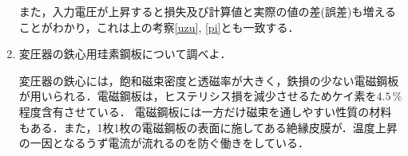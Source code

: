 \begin{enumerate}[1.]
	また，入力電圧が上昇すると損失及び計算値と実際の値の差(誤差)も増えることがわかり，これは上の考察\ref{uzu}, \ref{pi}とも一致する．
	\item 変圧器の鉄心用珪素鋼板について調べよ．\cite{1130282270091060}
	
	変圧器の鉄心には，飽和磁束密度と透磁率が大きく，鉄損の少ない電磁鋼板が用いられる．電磁鋼板は，ヒステリシス損を減少させるためケイ素を$4.5\,\%$程度含有させている．
	電磁鋼板には一方だけ磁束を通しやすい性質の材料もある．また，1枚1枚の電磁鋼板の表面に施してある絶縁皮膜が．温度上昇の一因となるうず電流が流れるのを防ぐ働きをしている．
\end{enumerate}